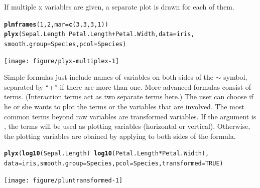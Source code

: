 \documentclass[11pt]{article}\usepackage[]{graphicx}\usepackage[]{color}
\makeatletter
\newcommand{\hlnum}[1]{\textcolor[rgb]{0.686,0.059,0.569}{#1}}%
\newcommand{\hlopt}[1]{\textcolor[rgb]{0,0,0}{#1}}%
\newcommand{\hlstd}[1]{\textcolor[rgb]{0.345,0.345,0.345}{#1}}%
\newcommand{\hlkwc}[1]{\textcolor[rgb]{0.333,0.667,0.333}{#1}}%
\newcommand{\hlkwd}[1]{\textcolor[rgb]{0.737,0.353,0.396}{\textbf{#1}}}%
\newenvironment{kframe}{%
 \def\at@end@of@kframe{}%
 \ifinner\ifhmode%
  \def\at@end@of@kframe{\end{minipage}}%
  \begin{minipage}{\columnwidth}%
 \fi\fi%
 \def\FrameCommand##1{\hskip\@totalleftmargin \hskip-\fboxsep
 \colorbox{shadecolor}{##1}\hskip-\fboxsep
     \hskip-\linewidth \hskip-\@totalleftmargin \hskip\columnwidth}%
 \MakeFramed {\advance\hsize-\width
   \@totalleftmargin\z@ \linewidth\hsize
   \@setminipage}}%
 {\par\unskip\endMakeFramed%
 \at@end@of@kframe}
\newenvironment{knitrout}{}{} %
\makeatother
\begin{document}
If multiple x variables are given, a separate plot is drawn for each of them.
\begin{knitrout}
\color{fgcolor}\begin{kframe}
\begin{alltt}
\hlkwd{plmframes}\hlstd{(}\hlnum{1}\hlstd{,}\hlnum{2}\hlstd{,} \hlkwc{mar}\hlstd{=}\hlkwd{c}\hlstd{(}\hlnum{3}\hlstd{,}\hlnum{3}\hlstd{,}\hlnum{3}\hlstd{,}\hlnum{1}\hlstd{))}
\hlkwd{plyx}\hlstd{(Sepal.Length}\hlopt{~}\hlstd{Petal.Length}\hlopt{+}\hlstd{Petal.Width,} \hlkwc{data}\hlstd{=iris,}
     \hlkwc{smooth.group}\hlstd{=Species,} \hlkwc{pcol}\hlstd{=Species)}
\end{alltt}
\end{kframe}
\texttt{[image: figure/plyx-multiplex-1]} 
\end{knitrout}
\label{plyx-multiplex}


Simple formulas just include names of variables on both sides of the $\sim$
symbol, separated by ``+'' if there are more than one. 
More advanced formulas consist of terms.
(Interaction terms act as two separate terms here.)
The user can choose if he or she wants to plot the terms or the variables
that are involved. 
The most common terms beyond raw variables are transformed variables.
If the argument  is , the terms will be used as
plotting variables (horizontal or vertical). 
Otherwise, the plotting variables are obained by applying  to
both sides of the formula.

\begin{knitrout}
\color{fgcolor}\begin{kframe}
\begin{alltt}
  \hlkwd{plyx}\hlstd{(}\hlkwd{log10}\hlstd{(Sepal.Length)} \hlopt{~} \hlkwd{log10}\hlstd{(Petal.Length}\hlopt{*}\hlstd{Petal.Width),}
       \hlkwc{data}\hlstd{=iris,} \hlkwc{smooth.group}\hlstd{=Species,} \hlkwc{pcol}\hlstd{=Species,} \hlkwc{transformed}\hlstd{=}\hlnum{TRUE}\hlstd{)}
\end{alltt}
\end{kframe}
\texttt{[image: figure/pluntransformed-1]} 
\end{knitrout}
\end{document}
